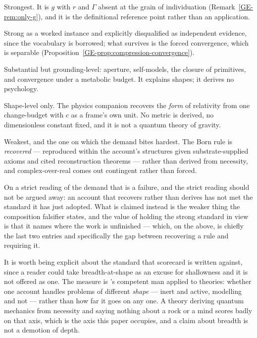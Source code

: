 \documentclass[11pt,a4paper]{article}
\begin{document}
\begin{description}[leftmargin=*,style=nextline]
\item[Rock.] Strongest. It is $g$ with $r$ and $\Gamma$ absent at the grain of individuation
(Remark~\ref{GE-rem:only-g}), and it is the definitional reference point rather than an application.
\item[Computers.] Strong as a worked instance and explicitly disqualified as independent evidence,
since the vocabulary is borrowed; what survives is the forced convergence, which is separable
(Proposition~\ref{GE-prop:compression-convergence}).
\item[Cognition.] Substantial but grounding-level: aperture, self-models, the closure of primitives,
and convergence under a metabolic budget. It explains shapes; it derives no psychology.
\item[Observable universe.] Shape-level only. The physics companion recovers the \emph{form} of
relativity from one change-budget with $c$ as a frame's own unit. No metric is derived, no
dimensionless constant fixed, and it is not a quantum theory of gravity.
\item[Quantum physics.] Weakest, and the one on which the demand bites hardest. The Born rule is
\emph{recovered} --- reproduced within the account's structures given substrate-supplied axioms and
cited reconstruction theorems --- rather than derived from necessity, and complex-over-real comes out
contingent rather than forced.
\end{description}

On a strict reading of the demand that is a failure, and the strict reading should not be argued
away: an account that recovers rather than derives has not met the standard it has just adopted.
What is claimed instead is the weaker thing the composition falsifier states, and the value of
holding the strong standard in view is that it names where the work is unfinished --- which, on the
above, is chiefly the last two entries and specifically the gap between recovering a rule and
requiring it.

It is worth being explicit about the standard that scorecard is written against, since a reader could
take breadth-at-shape as an excuse for shallowness and it is not offered as one. The measure is \citeauthor{heinlein1973}'s
competent man \citep{heinlein1973} applied to theories: whether one account handles problems of different \emph{shape}
--- inert and active, modelling and not --- rather than how far it goes on any one. A theory deriving
quantum mechanics from necessity and saying nothing about a rock or a mind scores badly on that axis,
which is the axis this paper occupies, and a claim about breadth is not a demotion of depth.
\end{document}
